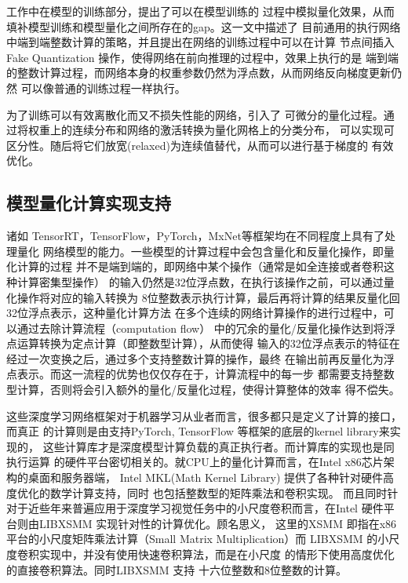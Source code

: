工作\cite{Jacob2017QuantizationAT}中在模型的训练部分，提出了可以在模型训练的
过程中模拟量化效果，从而填补模型训练和模型量化之间所存在的gap。这一文中描述了
目前通用的执行网络中端到端整数计算的策略，并且提出在网络的训练过程中可以在计算
节点间插入 Fake Quantization 操作，使得网络在前向推理的过程中，效果上执行的是
端到端的整数计算过程，而网络本身的权重参数仍然为浮点数，从而网络反向梯度更新仍然
可以像普通的训练过程一样执行。

\cite{Louizos2019RelaxedQF} 为了训练可以有效离散化而又不损失性能的网络，引入了
可微分的量化过程。通过将权重上的连续分布和网络的激活转换为量化网格上的分类分布，
可以实现可区分性。随后将它们放宽(relaxed)为连续值替代，从而可以进行基于梯度的
有效优化。

\subsection{模型量化计算实现支持}

诸如 TensorRT，TensorFlow，PyTorch，MxNet等框架均在不同程度上具有了处理量化
网络模型的能力。一些模型的计算过程中会包含量化和反量化操作，即量化计算的过程
并不是端到端的，即网络中某个操作（通常是如全连接或者卷积这种计算密集型操作）
的输入仍然是32位浮点数，在执行该操作之前，可以通过量化操作将对应的输入转换为
8位整数表示执行计算，最后再将计算的结果反量化回32位浮点表示，这种量化计算方法
在多个连续的网络计算操作的进行过程中，可以通过去除计算流程（computation flow）
中的冗余的量化/反量化操作达到将浮点运算转换为定点计算（即整数型计算），从而使得
输入的32位浮点表示的特征在经过一次变换之后，通过多个支持整数计算的操作，最终
在输出前再反量化为浮点表示。而这一流程的优势也仅仅存在于，计算流程中的每一步
都需要支持整数型计算，否则将会引入额外的量化/反量化过程，使得计算整体的效率
得不偿失。

这些深度学习网络框架对于机器学习从业者而言，很多都只是定义了计算的接口，而真正
的计算则是由支持PyTorch, TensorFlow 等框架的底层的kernel library来实现的，
这些计算库才是深度模型计算负载的真正执行者。而计算库的实现也是同执行运算
的硬件平台密切相关的。就CPU上的量化计算而言，在Intel x86芯片架构的桌面和服务器端，
Intel MKL(Math Kernel Library) 提供了各种针对硬件高度优化的数学计算支持，同时
也包括整数型的矩阵乘法和卷积实现。
而且同时针对于近些年来普遍应用于深度学习视觉任务中的小尺度卷积而言，在Intel
硬件平台则由LIBXSMM\cite{Heinecke2016LIBXSMMAS} 实现针对性的计算优化。顾名思义，
这里的XSMM 即指在x86 平台的小尺度矩阵乘法计算（Small Matrix Multiplication）而
LIBXSMM 的小尺度卷积实现中，并没有使用快速卷积算法，而是在小尺度
的情形下使用高度优化的直接卷积算法。同时LIBXSMM 支持 十六位整数和8位整数的计算。

